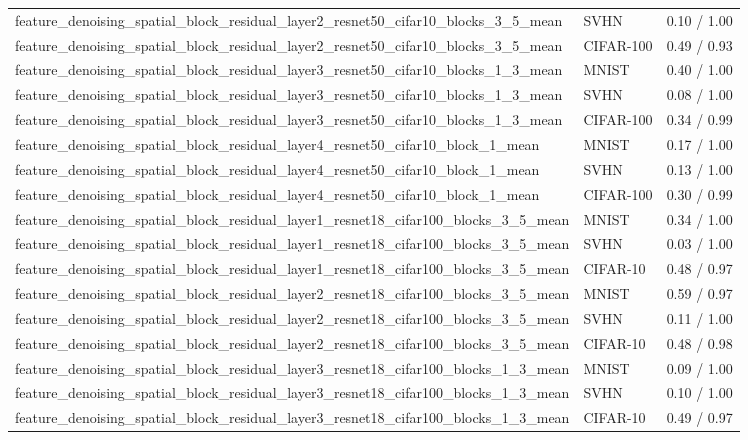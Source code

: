 \begin{tabular}{lll}
feature\_denoising\_spatial\_block\_residual\_layer2\_resnet50\_cifar10\_blocks\_3\_5\_mean & SVHN & 0.10 / 1.00 \\
feature\_denoising\_spatial\_block\_residual\_layer2\_resnet50\_cifar10\_blocks\_3\_5\_mean & CIFAR-100 & 0.49 / 0.93 \\
feature\_denoising\_spatial\_block\_residual\_layer3\_resnet50\_cifar10\_blocks\_1\_3\_mean & MNIST & 0.40 / 1.00 \\
feature\_denoising\_spatial\_block\_residual\_layer3\_resnet50\_cifar10\_blocks\_1\_3\_mean & SVHN & 0.08 / 1.00 \\
feature\_denoising\_spatial\_block\_residual\_layer3\_resnet50\_cifar10\_blocks\_1\_3\_mean & CIFAR-100 & 0.34 / 0.99 \\
feature\_denoising\_spatial\_block\_residual\_layer4\_resnet50\_cifar10\_block\_1\_mean & MNIST & 0.17 / 1.00 \\
feature\_denoising\_spatial\_block\_residual\_layer4\_resnet50\_cifar10\_block\_1\_mean & SVHN & 0.13 / 1.00 \\
feature\_denoising\_spatial\_block\_residual\_layer4\_resnet50\_cifar10\_block\_1\_mean & CIFAR-100 & 0.30 / 0.99 \\
feature\_denoising\_spatial\_block\_residual\_layer1\_resnet18\_cifar100\_blocks\_3\_5\_mean & MNIST & 0.34 / 1.00 \\
feature\_denoising\_spatial\_block\_residual\_layer1\_resnet18\_cifar100\_blocks\_3\_5\_mean & SVHN & 0.03 / 1.00 \\
feature\_denoising\_spatial\_block\_residual\_layer1\_resnet18\_cifar100\_blocks\_3\_5\_mean & CIFAR-10 & 0.48 / 0.97 \\
feature\_denoising\_spatial\_block\_residual\_layer2\_resnet18\_cifar100\_blocks\_3\_5\_mean & MNIST & 0.59 / 0.97 \\
feature\_denoising\_spatial\_block\_residual\_layer2\_resnet18\_cifar100\_blocks\_3\_5\_mean & SVHN & 0.11 / 1.00 \\
feature\_denoising\_spatial\_block\_residual\_layer2\_resnet18\_cifar100\_blocks\_3\_5\_mean & CIFAR-10 & 0.48 / 0.98 \\
feature\_denoising\_spatial\_block\_residual\_layer3\_resnet18\_cifar100\_blocks\_1\_3\_mean & MNIST & 0.09 / 1.00 \\
feature\_denoising\_spatial\_block\_residual\_layer3\_resnet18\_cifar100\_blocks\_1\_3\_mean & SVHN & 0.10 / 1.00 \\
feature\_denoising\_spatial\_block\_residual\_layer3\_resnet18\_cifar100\_blocks\_1\_3\_mean & CIFAR-10 & 0.49 / 0.97 \\

\end{tabular}
